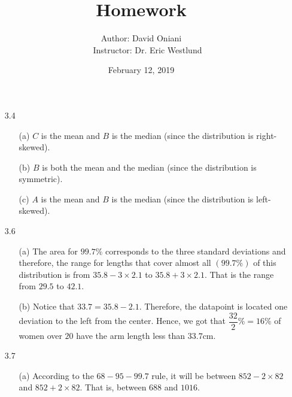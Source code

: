 \documentclass[11pt, a4paper]{article}
\title{\bf{Homework \textnumero 1}}
\author{Author: David Oniani
\\
\ \ \ Instructor: Dr. Eric Westlund}
\date{February 12, 2019}
\begin{document}
\maketitle

\begin{itemize}
\item[3.4]
\begin{itemize}
\item[(a)]
$C$ is the mean and $B$ is the median (since the distribution is right-skewed).

\item[]

\item[(b)]
$B$ is both the mean and the median (since the distribution is symmetric).

\item[]

\item[(c)]
$A$ is the mean and $B$ is the median (since the distribution is left-skewed).
\end{itemize}

\item[]
\item[]

\item[3.6]
\begin{itemize}
\item[(a)]
The area for $99.7\%$ corresponds to the three standard deviations and therefore, the range for lengths
that cover almost all $(99.7\%)$ of this distribution is from $35.8 - 3 \times 2.1$
to $35.8 + 3 \times 2.1$. That is the range from $29.5$ to $42.1$.

\item[]

\item[(b)]
Notice that $33.7 = 35.8 - 2.1$. Therefore, the datapoint is located one deviation to the left from the center.
Hence, we got that $\dfrac{32}{2}\% = 16\%$ of women over $20$ have the arm length less than $33.7$cm.
\end{itemize}

\item[]
\item[]

\item[3.7]
\begin{itemize}
\item[(a)]
According to the $68 - 95 - 99.7$ rule, it will be between
$852 - 2 \times 82$ and $852 + 2 \times 82$. That is,
between $688$ and $1016$.


\end{itemize}
\end{itemize}
\end{document}
